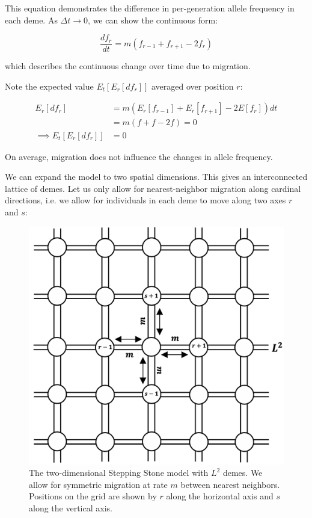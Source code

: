 This equation demonstrates the difference in per-generation allele frequency in each deme. As $\Delta t \to 0$, we can show the continuous form:

\begin{equation}
    \frac{df_r}{dt} = m(f_{r-1} + f_{r+1} -2f_r)
\end{equation}

which describes the continuous change over time due to migration. 


Note the expected value $E_t[E_r[df_r]]$ averaged over position $r$:

\begin{equation}
    \begin{split}
        E_r[df_r] &= m(E_r[f_{r-1}] + E_r[f_{r+1}] -2E[f_r])dt \\
        &= m(f+f-2f) = 0 \\
        \implies E_t[E_r[df_r]] &= 0 
    \end{split}
\end{equation}


On average, migration does not influence the changes in allele frequency. 


We can expand the model to two spatial dimensions. This gives an interconnected lattice of demes. Let us only allow for nearest-neighbor migration along cardinal directions, i.e. we allow for individuals in each deme to move along two axes $r$ and $s$:

\begin{figure}[h]
    \centering
    \includegraphics[scale = 0.3]{img/2d_ss.png}
    \caption{The two-dimensional Stepping Stone model with $L^2$ demes. We allow for symmetric migration at rate $m$ between nearest neighbors. Positions on the grid are shown by $r$ along the horizontal axis and $s$ along the vertical axis.}
    \label{fig:2d_ss}
\end{figure}


